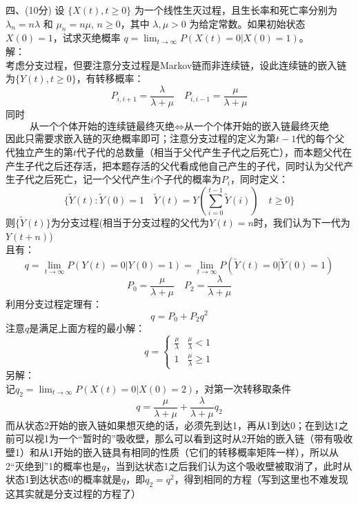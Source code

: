\documentclass[UTF8]{ctexart}
\begin{document}
\noindent 四、(10分) 设 $\{X(t), t \geq 0\}$ 为一个线性生灭过程，且生长率和死亡率分别为 $\lambda_n = n\lambda$ 和 $\mu_n = n\mu$, $n \geq 0$，其中 $\lambda, \mu > 0$ 为给定常数。如果初始状态 $X(0) = 1$，试求灭绝概率 $q= \lim_{t \to \infty} P(X(t) = 0|X(0) = 1)$。\\
解：\\
考虑分支过程，但要注意分支过程是Markov链而非连续链，设此连续链的嵌入链为$\{Y(t), t \geq 0\}$，有转移概率：\\
\[
P_{i,i+1}=\frac{\lambda}{\lambda+\mu} \quad P_{i,i-1}=\frac{\mu}{\lambda+\mu}
\]
同时
\[
\text{从一个个体开始的连续链最终灭绝} \iff \text{从一个个体开始的嵌入链最终灭绝}
\]
因此只需要求嵌入链的灭绝概率即可；注意分支过程的定义为第$t-1$代的每个父代独立产生的第$t$代子代的总数量（相当于父代产生子代之后死亡），而本题父代在产生子代之后还存活，把本题存活的父代看成他自己产生的子代，同时认为父代产生子代之后死亡，记一个父代产生$i$个子代的概率为$P_i$，同时定义：\\
\[
\{\tilde{Y}(t):\tilde{Y}(0)=1\quad \tilde{Y}(t)=Y\left(\sum\limits_{i=0}^{t-1}  \tilde{Y}(i) \right)  \quad t \geq 0\}
\]
则$\{\tilde{Y}(t) \}$为分支过程(相当于分支过程的父代为$Y(t)=n$时，我们认为下一代为$Y(t+n)$)\\
且有：
\[
q= \lim_{t \to \infty} P(Y(t) = 0|Y(0) = 1)= \lim_{t \to \infty} P(\tilde{Y}(t) = 0|\tilde{Y}(0) = 1)
\]
\[
P_0=\frac{\mu}{\lambda+\mu} \quad P_2=\frac{\lambda}{\lambda+\mu}
\]
利用分支过程定理有：
\[
q=P_0+P_2q^2
\]
注意$q$是满足上面方程的最小解：
\[
q=
\begin{cases}
	\frac{\mu}{\lambda}  & \frac{\mu}{\lambda}<1  \\
	1  &  \frac{\mu}{\lambda}\ge 1
\end{cases}
\]
另解：\\
记$q_2=\lim_{t \to \infty} P(X(t) = 0|X(0) = 2)$，对第一次转移取条件\\
\[
q=\frac{\mu}{\lambda+\mu}+\frac{\lambda}{\lambda+\mu}q_2
\]
而从状态2开始的嵌入链如果想灭绝的话，必须先到达1，再从1到达0；在到达1之前可以视1为一个“暂时的”吸收壁，那么可以看到这时从2开始的嵌入链（带有吸收壁1）和从1开始的嵌入链具有相同的性质（它们的转移概率矩阵一样），所以从2“灭绝到”1的概率也是$q$，当到达状态1之后我们认为这个吸收壁被取消了，此时从状态1到达状态0的概率就是$q$，即$q_2=q^2$，得到相同的方程（写到这里也不难发现这其实就是分支过程的方程了）\\
\end{document}
